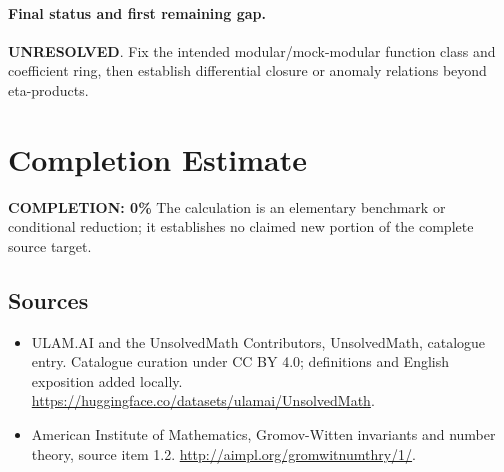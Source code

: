 \documentclass[11pt]{article}
\begin{document}
\paragraph{Final status and first remaining gap.}
\textbf{UNRESOLVED}. Fix the intended modular/mock-modular function class and coefficient ring, then establish differential closure or anomaly relations beyond eta-products.

\section{Completion Estimate}
\noindent\textbf{COMPLETION: 0\%}
The calculation is an elementary benchmark or conditional reduction; it establishes no claimed new portion of the complete source target.

\subsection{Sources}
\begin{itemize}
\item[\hypertarget{source:statement:1}{S1}] ULAM.AI and the UnsolvedMath Contributors, UnsolvedMath, catalogue entry. Catalogue curation under CC BY 4.0; definitions and English exposition added locally.
\url{https://huggingface.co/datasets/ulamai/UnsolvedMath}.
\item[\hypertarget{source:statement:2}{S2}] American Institute of Mathematics, Gromov-Witten invariants and number theory, source item 1.2.
\url{http://aimpl.org/gromwitnumthry/1/}.
\end{itemize}
\label{end:statement}
\end{document}
